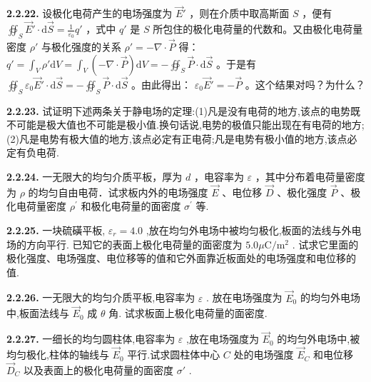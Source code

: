 \begin{center}
\end{center}

\vfill
\newpage

\textbf{2.2.22.} 设极化电荷产生的电场强度为 $\vec{E}'$ ，则在介质中取高斯面 $S$ ，便有 $\displaystyle \oiint_{S} \vec{E}' \cdot \mathrm{d}\vec{S} = \frac{1}{\varepsilon_0} q'$ ，式中 $q'$ 是 $S$ 所包住的极化电荷量的代数和。又由极化电荷量密度 $\rho'$ 与极化强度的关系 $\rho' = -\nabla \cdot \vec{P}$ 得： $\displaystyle q' = \int_V \rho' \mathrm{d}V = \int_V (-\nabla \cdot \vec{P}) \mathrm{d}V = -\oiint_{S} \vec{P} \cdot \mathrm{d}\vec{S}$ 。于是有 $\displaystyle \oiint_{S} \varepsilon_0 \vec{E}' \cdot \mathrm{d}\vec{S} = -\oiint_{S} \vec{P} \cdot \mathrm{d}\vec{S}$ 。由此得出： $\varepsilon_0 \vec{E}' = -\vec{P}$ 。这个结果对吗？为什么？

\vfill
\newpage

\textbf{2.2.23.} 试证明下述两条关于静电场的定理:(1)凡是没有电荷的地方,该点的电势既不可能是极大值也不可能是极小值.换句话说,电势的极值只能出现在有电荷的地方;(2)凡是电势有极大值的地方,该点必定有正电荷;凡是电势有极小值的地方,该点必定有负电荷.

\vfill
\newpage

\textbf{2.2.24.} 一无限大的均匀介质平板，厚为 $d$ ，电容率为 $\varepsilon$ ，其中分布着电荷量密度为 $\rho$ 的均匀自由电荷．试求板内外的电场强度 $\vec{E}$ 、电位移 $\vec{D}$ 、极化强度 $\vec{P}$ 、极化电荷量密度 $\rho^{\prime}$ 和极化电荷量的面密度 $\sigma^{\prime}$ 等.

\vfill
\newpage

\textbf{2.2.25.} 一块硫磺平板, $\varepsilon_{r}=4.0$ ,放在均匀外电场中被均匀极化,板面的法线与外电场的方向平行. 已知它的表面上极化电荷量的面密度为 $5.0\mu \mathrm{C} / \mathrm{m}^2$ . 试求它里面的极化强度、电场强度、电位移等的值和它外面靠近板面处的电场强度和电位移的值.

\vfill
\newpage

\textbf{2.2.26.} 一无限大的均匀介质平板,电容率为 $\varepsilon$ . 放在电场强度为 $\vec{E}_0$ 的均匀外电场中,板面法线与 $\vec{E}_0$ 成 $\theta$ 角. 试求板面上极化电荷量的面密度.

\vfill
\newpage

\textbf{2.2.27.} 一细长的均匀圆柱体,电容率为 $\varepsilon$ ,放在电场强度为 $\vec{E}_0$ 的均匀外电场中,被均匀极化,柱体的轴线与 $\vec{E}_0$ 平行.试求圆柱体中心 $C$ 处的电场强度 $\vec{E}_C$ 和电位移 $\vec{D}_C$ 以及表面上的极化电荷量的面密度 $\sigma'$ .

